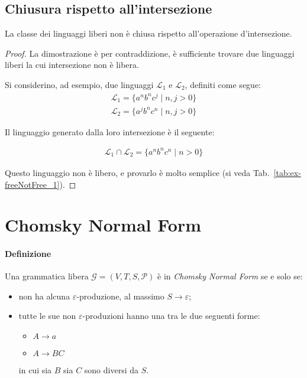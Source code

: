 \documentclass[class=book, crop=false, oneside, 12pt]{standalone}
\begin{document}
\subsection*{Chiusura rispetto all'intersezione}

\begin{lemma}
  La classe dei linguaggi liberi non è chiusa rispetto all'operazione d'intersezione.
\end{lemma}

\begin{proof}
  La dimostrazione è per contraddizione, è sufficiente trovare due linguaggi liberi la cui intersezione non è libera.

  Si considerino, ad esempio, due linguaggi \(\mathcal{L}_1\) e \(\mathcal{L}_2\), definiti come segue:
  \begin{align*}
      \mathcal{L}_1 = \{a^n b^n c^j \mid n, j > 0 \} \\
      \mathcal{L}_2 = \{a^j b^n c^n \mid n, j > 0 \}
  \end{align*}

  \noindent Il linguaggio generato dalla loro intersezione è il seguente:

  \begin{align*}
    \mathcal{L}_1 \cap \mathcal{L}_2 = \{ a^n b^n c^n \mid n > 0 \}
  \end{align*}

  \noindent Questo linguaggio non è libero, e provarlo è molto semplice (si veda Tab.~\ref{tab:ex-freeNotFree_1}).

\end{proof}

\section{Chomsky Normal Form}
\paragraph{Definizione}
Una grammatica libera \(\mathcal{G} = (V, T, S, \mathcal{P})\) è in \emph{Chomsky Normal Form} se e solo se:
\begin{itemize}
  \item non ha alcuna \(\varepsilon\)-produzione, al massimo \(S \rightarrow \varepsilon\);
  \item tutte le sue non \(\varepsilon\)-produzioni hanno una tra le due seguenti forme:
  \begin{itemize}
    \item \(A \rightarrow a\)
    \item \(A \rightarrow BC\)
  \end{itemize}
  in cui sia \(B\) sia \(C\) sono diversi da \(S\).
\end{itemize}
\end{document}
